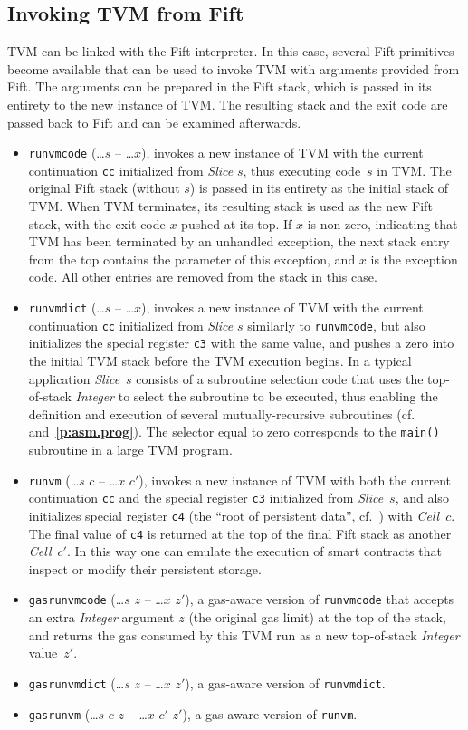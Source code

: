 \documentclass[12pt,oneside]{article}
\def\refpoint#1{{\rm\textbf{\ref{#1}}}}
\let\ptref=\refpoint
\def\mysubsection#1{\subsection{#1}\fancyhead[C]{\small{\textsc{\textrm{\thesubsection.} #1}}}}
\begin{document}
\mysubsection{Invoking TVM from Fift}\label{p:tvm.ops}
TVM can be linked with the Fift interpreter. In this case, several Fift primitives become available that can be used to invoke TVM with arguments provided from Fift. The arguments can be prepared in the Fift stack, which is passed in its entirety to the new instance of TVM. The resulting stack and the exit code are passed back to Fift and can be examined afterwards.
\begin{itemize}
\item {\tt runvmcode} (\dots $s$ -- \dots $x$), invokes a new instance of TVM with the current continuation {\tt cc} initialized from {\em Slice\/} $s$, thus executing code~$s$ in TVM. The original Fift stack (without $s$) is passed in its entirety as the initial stack of TVM. When TVM terminates, its resulting stack is used as the new Fift stack, with the exit code $x$ pushed at its top. If $x$ is non-zero, indicating that TVM has been terminated by an unhandled exception, the next stack entry from the top contains the parameter of this exception, and $x$ is the exception code. All other entries are removed from the stack in this case.
\item {\tt runvmdict} (\dots $s$ -- \dots $x$), invokes a new instance of TVM with the current continuation {\tt cc} initialized from {\em Slice\/} $s$ similarly to {\tt runvmcode}, but also initializes the special register {\tt c3} with the same value, and pushes a zero into the initial TVM stack before the TVM execution begins. In a typical application {\em Slice\/}~$s$ consists of a subroutine selection code that uses the top-of-stack {\em Integer\/} to select the subroutine to be executed, thus enabling the definition and execution of several mutually-recursive subroutines (cf.~\cite[4.6]{TVM} and~\ptref{p:asm.prog}). The selector equal to zero corresponds to the {\tt main()} subroutine in a large TVM program.
\item {\tt runvm} (\dots $s$ $c$ -- \dots $x$ $c'$), invokes a new instance of TVM with both the current continuation {\tt cc} and the special register {\tt c3} initialized from {\em Slice\/}~$s$, and also initializes special register {\tt c4} (the ``root of persistent data'', cf.~\cite[1.4]{TVM}) with {\em Cell\/}~$c$. The final value of {\tt c4} is returned at the top of the final Fift stack as another {\em Cell\/}~$c'$. In this way one can emulate the execution of smart contracts that inspect or modify their persistent storage.
\item {\tt gasrunvmcode} (\dots $s$ $z$ -- \dots $x$ $z'$), a gas-aware version of {\tt runvmcode} that accepts an extra {\em Integer\/} argument $z$ (the original gas limit) at the top of the stack, and returns the gas consumed by this TVM run as a new top-of-stack {\em Integer\/} value~$z'$.
\item {\tt gasrunvmdict} (\dots $s$ $z$ -- \dots $x$ $z'$), a gas-aware version of {\tt runvmdict}.
\item {\tt gasrunvm} (\dots $s$ $c$ $z$ -- \dots $x$ $c'$ $z'$), a gas-aware version of {\tt runvm}.
\end{itemize}
\end{document}
